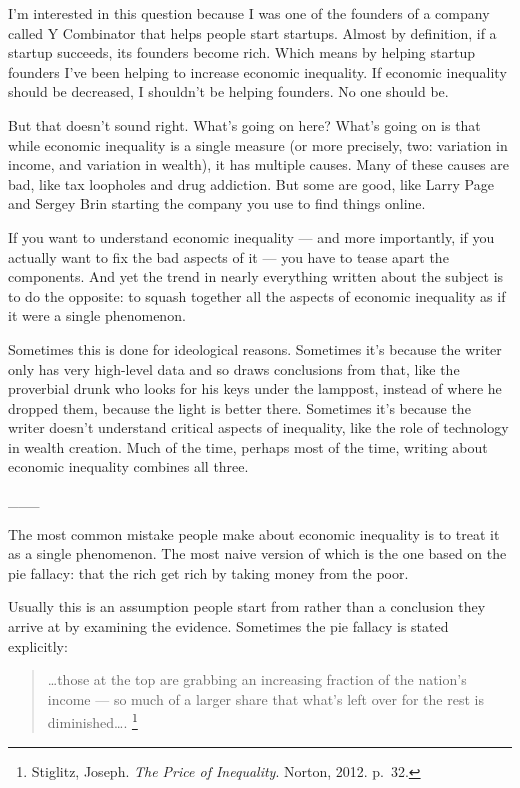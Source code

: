 \documentclass[12pt]{book}
\begin{document}
I'm interested in this question because I was one of the founders of a
company called Y Combinator that helps people start startups. Almost by
definition, if a startup succeeds, its founders become rich. Which means
by helping startup founders I've been helping to increase economic
inequality. If economic inequality should be decreased, I shouldn't be
helping founders. No one should be.

But that doesn't sound right. What's going on here? What's going on is
that while economic inequality is a single measure (or more precisely,
two: variation in income, and variation in wealth), it has multiple
causes. Many of these causes are bad, like tax loopholes and drug
addiction. But some are good, like Larry Page and Sergey Brin starting
the company you use to find things online.

If you want to understand economic inequality --- and more importantly,
if you actually want to fix the bad aspects of it --- you have to tease
apart the components. And yet the trend in nearly everything written
about the subject is to do the opposite: to squash together all the
aspects of economic inequality as if it were a single phenomenon.

Sometimes this is done for ideological reasons. Sometimes it's because
the writer only has very high-level data and so draws conclusions from
that, like the proverbial drunk who looks for his keys under the
lamppost, instead of where he dropped them, because the light is better
there. Sometimes it's because the writer doesn't understand critical
aspects of inequality, like the role of technology in wealth creation.
Much of the time, perhaps most of the time, writing about economic
inequality combines all three.

\_\_\_

The most common mistake people make about economic inequality is to
treat it as a single phenomenon. The most naive version of which is the
one based on the pie fallacy: that the rich get rich by taking money
from the poor.

Usually this is an assumption people start from rather than a conclusion
they arrive at by examining the evidence. Sometimes the pie fallacy is
stated explicitly:

\begin{quote}
\ldots those at the top are grabbing an increasing fraction of the
nation's income --- so much of a larger share that what's left over for
the rest is diminished\ldots. \footnote{Stiglitz, Joseph. \emph{The Price of Inequality}. Norton, 2012.
p.~32.}
\end{quote}
\end{document}
